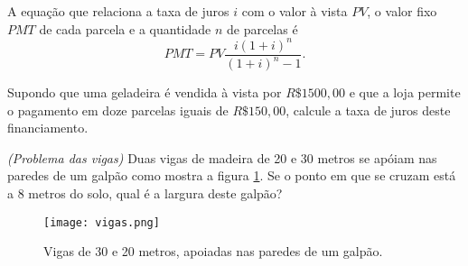 \begin{ex}\label{prob.matfin}
 A equação que relaciona a taxa de juros $i$ com o valor à vista $PV$, o valor fixo $PMT$ de cada parcela e a quantidade $n$ de parcelas  é
 $$PMT=PV \frac{i(1+i)^n}{(1+i)^n-1}.$$


Supondo que uma geladeira é vendida à vista por $R\$1500,00$ e que a loja permite o pagamento em doze parcelas iguais de $R\$150,00$, calcule a taxa de juros deste financiamento.
\end{ex}
\begin{ex}\label{prob.vigas}\emph{(Problema das vigas)}
Duas vigas de madeira de 20 e 30 metros se apóiam nas paredes de um galpão como mostra a figura \ref{fig.vigas}. Se o ponto em que se cruzam está a 8 metros do solo, qual é a largura deste galpão?
\begin{figure}
\center
\texttt{[image: vigas.png]}
\caption{Vigas de 30 e 20 metros, apoiadas nas paredes de um galpão.}\label{fig.vigas}
\end{figure}

\end{ex}